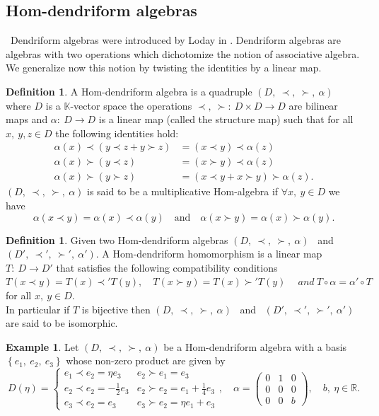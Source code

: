 \documentclass[11pt,twoside,reqno]{amsart}
\theoremstyle{plain}
\theoremstyle{definition}
\newtheorem{ex}[thm]{Example}
\newtheorem{definition}[thm]{Definition}
\begin{document}
 \subsection{Hom-dendriform algebras}\ 
Dendriform algebras were introduced by Loday in \cite{L}. Dendriform algebras are algebras with two operations  which dichotomize the notion of associative algebra. We
 generalize now this notion by twisting the identities by a linear map.
\begin{definition}\label{d1}
A Hom-dendriform algebra is a quadruple $(D,\  \prec,\  \succ,\  \alpha)$  where $D$ is a $\mathbb{K}$-vector space  the operations $\prec, \  \succ : \ D \times D \to D$ are bilinear maps and $\alpha : \ D \to D$ is a linear map (called the structure map)  such that for all $x , \ y,  z \in D$  the following identities hold:
\begin{align}
\alpha(x) \prec (y \prec z + y \succ z)& = (x \prec y) \prec \alpha(z) \label{eq1} \\
\alpha(x) \succ (y \prec z)& = (x \succ y) \prec \alpha(z) \label{eq2} \\
\alpha(x) \succ (y \succ z)& = (x \prec y + x \succ y) \succ \alpha(z)  \label{eq3}.
\end{align}
$(D,\  \prec,\  \succ,\  \alpha)$ is said to be a multiplicative Hom-algebra if $\forall x,\  y \in D$ we have $$\alpha(x\prec y)=\alpha(x)\prec\alpha(y)\quad \text{and}\quad\alpha(x\succ y)=\alpha(x)\succ\alpha(y).$$
\end{definition}
\begin{definition}\label{d2}
Given two Hom-dendriform algebras $(D,\  \prec,\  \succ,\  \alpha)$ \ and $(D',\  \prec',\  \succ',\  \alpha')$. A Hom-dendriform homomorphism is a linear map $T : \ D \to D'$ that satisfies the following compatibility conditions\\
$T(x \prec y) =T(x) \prec' T(y) ,\quad 
T(x \succ y) = T(x) \succ'T(y)  \quad \ and  \   T \circ \alpha = \alpha' \circ T$ 
for all $x ,\ y\in D$.\\
 In particular  if $T$ is bijective then $(D,\  \prec,\  \succ,\  \alpha)$ \ and \ $(D',\  \prec',\  \succ',\  \alpha')$ are said to be isomorphic.
\end{definition}
\begin{ex}
Let $(D,\  \prec,\  \succ,\  \alpha)$ be a Hom-dendriform algebra with a basis $\left\{e_1 ,\ e_2 ,\ e_3\right\}$ whose non-zero product are given by
$$
D(\eta)= \left\{
    \begin{array}{ll}
      e_1\prec e_2=\eta e_3&e_2\succ  e_1=e_3\\
      e_2\prec e_2=-\frac{1}{2}e_3&e_2\succ  e_2=e_1+\frac{1}{4}e_3\\
			e_3\prec e_2=e_3&e_3\succ  e_2=\eta e_1+e_3 
    \end{array}
\right.,\quad
\alpha = 
\begin{pmatrix}
0 & 1 &0 \\
0 & 0 &0 \\
0 &0&b
\end{pmatrix},\quad  b,\ \eta \in\mathbb{R}.
$$
\end{ex}
\end{document}
